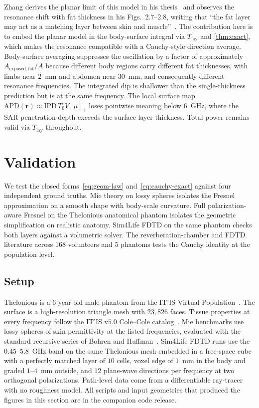 \documentclass[journal,twocolumn,10pt]{IEEEtran}
\theoremstyle{plain}
\theoremstyle{remark}
\newcommand{\rr}{\mathbf{r}}
\newcommand{\IPD}{\mathrm{IPD}}
\newcommand{\APD}{\mathrm{APD}}
\newcommand{\Tlay}{T_{\mathrm{lay}}}
\newcommand{\pospart}[1]{\left[#1\right]_{+}}
\newcommand{\Vis}{V}
\begin{document}
Zhang derives the planar limit of this model in his
thesis~\cite[Sec.~2.2]{Zhang2017thesis} and observes the resonance
shift with fat thickness in his Figs.~2.7--2.8, writing that ``the
fat layer may act as a matching layer between skin and
muscle''~\cite[p.~21]{Zhang2017thesis}. The contribution here is to
embed the planar model in the body-surface integral via $\Tlay$ and
\cref{thm:exact}, which makes the resonance compatible with a
Cauchy-style direction average. Body-surface averaging suppresses
the oscillation by a factor of approximately
$A_{\mathrm{exposed,fat}}/A$ because different body regions carry
different fat thicknesses, with limbs near $2$~mm and abdomen near
$30$~mm, and consequently different resonance frequencies. The
integrated dip is shallower than the single-thickness prediction but
is at the same frequency. The local surface map
$\APD(\rr) \approx \IPD\,T_0 \Vis \pospart{\mu}$ loses pointwise
meaning below $6$~GHz, where the SAR penetration depth exceeds the
surface layer thickness. Total power remains valid via $\Tlay$
throughout.


\section{Validation}\label{sec:val}

We test the closed forms~\eqref{eq:geom-law}
and~\eqref{eq:cauchy-exact} against four independent ground truths.
Mie theory on lossy spheres isolates the Fresnel approximation on a
smooth shape with body-scale curvature. Full polarization-aware
Fresnel on the Thelonious anatomical phantom isolates the geometric
simplification on realistic anatomy. Sim4Life FDTD on the same
phantom checks both layers against a volumetric solver. The
reverberation-chamber and FDTD literature across $168$ volunteers
and $5$ phantoms tests the Cauchy identity at the population level.

\subsection{Setup}\label{subsec:val-setup}
Thelonious is a 6-year-old male phantom from the IT'IS Virtual
Population~\cite{ITISv5}. The surface is a high-resolution triangle
mesh with $23{,}826$ faces. Tissue properties at every frequency
follow the IT'IS v$5.0$ Cole--Cole catalog~\cite{ITISv5}. Mie
benchmarks use lossy spheres of skin permittivity at the listed
frequencies, evaluated with the standard recursive series of Bohren
and Huffman~\cite{BohrenHuffman1983}. Sim4Life FDTD runs use the
$0.45$--$5.8$~GHz band on the same Thelonious mesh embedded in a
free-space cube with a perfectly matched layer of $10$ cells, voxel
edge of $1$~mm in the body and graded $1$--$4$~mm outside, and
$12$ plane-wave directions per frequency at two orthogonal
polarizations. Path-level data come from a differentiable
ray-tracer~\cite{SionnaRT} with no roughness model. All scripts and
input geometries that produced the figures in this section are in the
companion code release.
\end{document}
